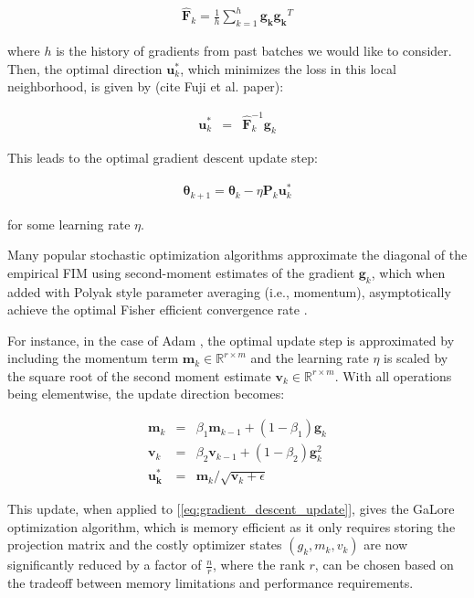 \begin{eqnarray}
\mathbf{\hat{F}}_{k} = \frac{1}{h} \sum_{k=1}^{h} \mathbf{g_{k}} \mathbf{g_{k}}^{T}
\end{eqnarray}

where \(h\) is the history of gradients from past batches we would like to consider. Then, the optimal direction \(\mathbf{u}_{k}^{*}\), which minimizes the loss in this local neighborhood, is given by (cite Fuji et al. paper):

\begin{eqnarray}
\mathbf{u}_{k}^{*} &=& \mathbf{\hat{F}}_{k}^{-1} \mathbf{g}_{k}
\label{eq:optimal_direction}
\end{eqnarray}

This leads to the optimal gradient descent update step:

\begin{eqnarray}
\mathbf{\theta}_{k+1} = \mathbf{\theta}_{k} - \eta \mathbf{P}_{k} \mathbf{u}_{k}^{*}
\label{eq:gradient_descent_update}
\end{eqnarray}

for some learning rate \(\eta\).

Many popular stochastic optimization algorithms approximate the diagonal of the empirical FIM using second-moment estimates of the gradient \(\mathbf{g}_{k}\), which when added with Polyak style parameter averaging (i.e., momentum), asymptotically achieve the optimal Fisher efficient convergence rate \citep{martens2020new}.

For instance, in the case of Adam \citep{kingmaAdamMethodStochastic2014}, the optimal update step is approximated by including the momentum term \(\mathbf{m}_{k} \in \mathbb{R}^{r\times m}\) and the learning rate \(\eta\) is scaled by the square root of the second moment estimate \(\mathbf{v}_{k} \in \mathbb{R}^{r\times m}\). With all operations being elementwise, the update direction becomes:

\begin{eqnarray}
    \mathbf{m}_{k} &=& \beta_{1} \mathbf{m}_{k-1} + (1-\beta_{1}) \mathbf{g}_{k} \\
    \mathbf{v}_{k} &=& \beta_{2} \mathbf{v}_{k-1} + (1-\beta_2) \mathbf{g}^{2}_{k}  \\
    \mathbf{u_{k}^{*}} &=& \mathbf{m}_{k} / \sqrt{\mathbf{v}_{k} + \epsilon}
    \label{eq:adam_update}
\end{eqnarray}

This update, when applied to [\ref{eq:gradient_descent_update}], gives the GaLore optimization algorithm, which is memory efficient as it only requires storing the projection matrix and the costly optimizer states \(\left(g_{k}, m_{k}, v_{k}\right)\) are now significantly reduced by a factor of \(\frac{n}{r}\), where the rank \(r\), can be chosen based on the tradeoff between memory limitations and performance requirements.

